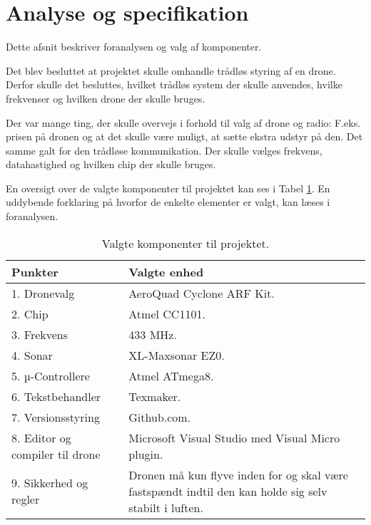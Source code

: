\documentclass[Main]{subfiles}
\begin{document}
\section{Analyse og specifikation}
Dette afsnit beskriver foranalysen\cite{Foranalyse} og valg af komponenter.

Det blev besluttet at projektet skulle omhandle trådløs styring af en drone. 
Derfor skulle det besluttes, hvilket trådløs system der skulle anvendes, hvilke frekvenser og hvilken drone der skulle bruges.

Der var mange ting, der skulle overvejs i forhold til valg af drone og radio:
F.eks. prisen på dronen og at det skulle være muligt, at sætte ekstra udstyr på den.
Det samme galt for den trådløse kommunikation. 
Der skulle vælges frekvens, datahastighed og hvilken chip der skulle bruges.

En oversigt over de valgte komponenter til projektet kan ses i Tabel \ref{Tab:komponentliste}.
En uddybende forklaring på hvorfor de enkelte elementer er valgt, kan læses i 
foranalysen\cite{Foranalyse}.

\begin{table}[H]
	\begin{tabular}{p{} p{}}
	\hline
	Punkter & Valgte enhed \\ \hline
	1. Dronevalg & AeroQuad Cyclone ARF Kit. \\
	2. Chip & Atmel CC1101.\\
	3. Frekvens & 433 MHz.\\
	4. Sonar & XL-Maxsonar EZ0.\\
	5. µ-Controllere & Atmel ATmega8.\\
	6. Tekstbehandler & Texmaker.\\
	7. Versionsstyring & Github.com.\\
	8. Editor og compiler til drone & Microsoft Visual Studio med Visual Micro plugin.\\
	9. Sikkerhed og regler & Dronen må kun flyve inden for og skal være fastspændt indtil den kan holde sig selv stabilt i luften.\\ \hline
	\end{tabular}

\caption{Valgte komponenter til projektet.}
\label{Tab:komponentliste}
\end{table}
\end{document}

